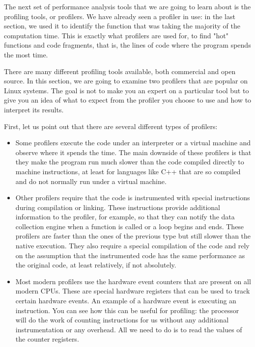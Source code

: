 
The next set of performance analysis tools that we are going to learn about is the profiling tools, or profilers. We have already seen a profiler in use: in the last section, we used it to identify the function that was taking the majority of the computation time. This is exactly what profilers are used for, to find "hot" functions and code fragments, that is, the lines of code where the program spends the most time.

There are many different profiling tools available, both commercial and open source. In this section, we are going to examine two profilers that are popular on Linux systems. The goal is not to make you an expert on a particular tool but to give you an idea of what to expect from the profiler you choose to use and how to interpret its results.

First, let us point out that there are several different types of profilers:

\begin{itemize}
\item Some profilers execute the code under an interpreter or a virtual machine and observe where it spends the time. The main downside of these profilers is that they make the program run much slower than the code compiled directly to machine instructions, at least for languages like C++ that are so compiled and do not normally run under a virtual machine.

\item Other profilers require that the code is instrumented with special instructions during compilation or linking. These instructions provide additional information to the profiler, for example, so that they can notify the data collection engine when a function is called or a loop begins and ends. These profilers are faster than the ones of the previous type but still slower than the native execution. They also require a special compilation of the code and rely on the assumption that the instrumented code has the same performance as the original code, at least relatively, if not absolutely.

\item Most modern profilers use the hardware event counters that are present on all modern CPUs. These are special hardware registers that can be used to track certain hardware events. An example of a hardware event is executing an instruction. You can see how this can be useful for profiling: the processor will do the work of counting instructions for us without any additional instrumentation or any overhead. All we need to do is to read the values of the counter registers.

\end{itemize}

